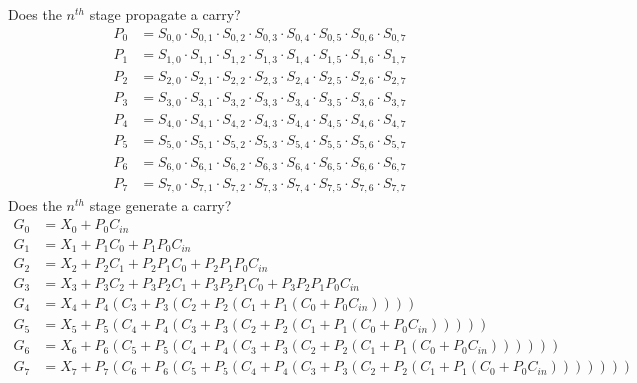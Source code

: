 \documentclass[a4paper, 11pt]{article}
\begin{document}
            Does the \(n^{th}\) stage propagate a carry?
            \scriptsize{
            \begin{align}
                P_0 &= S_{0,0}\cdot S_{0,1}\cdot S_{0,2}\cdot S_{0,3}\cdot S_{0,4}\cdot S_{0,5}\cdot S_{0,6}\cdot S_{0,7}\\
                P_1 &= S_{1,0}\cdot S_{1,1}\cdot S_{1,2}\cdot S_{1,3}\cdot S_{1,4}\cdot S_{1,5}\cdot S_{1,6}\cdot S_{1,7}\\
                P_2 &= S_{2,0}\cdot S_{2,1}\cdot S_{2,2}\cdot S_{2,3}\cdot S_{2,4}\cdot S_{2,5}\cdot S_{2,6}\cdot S_{2,7}\\
                P_3 &= S_{3,0}\cdot S_{3,1}\cdot S_{3,2}\cdot S_{3,3}\cdot S_{3,4}\cdot S_{3,5}\cdot S_{3,6}\cdot S_{3,7}\\
                P_4 &= S_{4,0}\cdot S_{4,1}\cdot S_{4,2}\cdot S_{4,3}\cdot S_{4,4}\cdot S_{4,5}\cdot S_{4,6}\cdot S_{4,7}\\
                P_5 &= S_{5,0}\cdot S_{5,1}\cdot S_{5,2}\cdot S_{5,3}\cdot S_{5,4}\cdot S_{5,5}\cdot S_{5,6}\cdot S_{5,7}\\
                P_6 &= S_{6,0}\cdot S_{6,1}\cdot S_{6,2}\cdot S_{6,3}\cdot S_{6,4}\cdot S_{6,5}\cdot S_{6,6}\cdot S_{6,7}\\
                P_7 &= S_{7,0}\cdot S_{7,1}\cdot S_{7,2}\cdot S_{7,3}\cdot S_{7,4}\cdot S_{7,5}\cdot S_{7,6}\cdot S_{7,7}
            \end{align}
            }\normalsize
            Does the \(n^{th}\) stage generate a carry?
            \scriptsize{
            \begin{align}
                G_0 &= X_0+P_0C_{in}\\
                G_1 &= X_1+P_1C_0+P_1P_0C_{in}\\
                G_2 &= X_2+P_2C_1+P_2P_1C_0+P_2P_1P_0C_{in}\\
                G_3 &= X_3+P_3C_2+P_3P_2C_1+P_3P_2P_1C_0+P_3P_2P_1P_0C_{in}\\
                G_4 &= X_4+P_4(C_3+P_3(C_2+P_2(C_1+P_1(C_0+P_0C_{in}))))\\
                G_5 &= X_5+P_5(C_4+P_4(C_3+P_3(C_2+P_2(C_1+P_1(C_0+P_0C_{in})))))\\
                G_6 &= X_6+P_6(C_5+P_5(C_4+P_4(C_3+P_3(C_2+P_2(C_1+P_1(C_0+P_0C_{in}))))))\\
                G_7 &= X_7+P_7(C_6+P_6(C_5+P_5(C_4+P_4(C_3+P_3(C_2+P_2(C_1+P_1(C_0+P_0C_{in}))))))) 
            \end{align}
            }\normalsize
\end{document}
